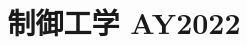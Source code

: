\documentclass[11pt,a4paper]{article}
\title{制御工学 AY2022}
\author{}
\date{}
\begin{document}
\maketitle


\bigskip

\end{document}
